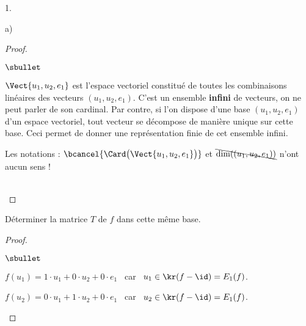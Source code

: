 \documentclass[11pt]{article}%
\begin{document}
\begin{noliste}{1.}
\begin{noliste}{a)}
\begin{proof}
\begin{remarkL}{.98}
\begin{noliste}{$\sbullet$}
        \item $\Vect{u_1, u_2, e_1}$ est l'espace vectoriel constitué
          de toutes les combinaisons linéaires des vecteurs $(u_1,
          u_2, e_1)$. C'est un ensemble {\bf infini} de vecteurs, on
          ne peut parler de son cardinal. Par contre, si l'on dispose
          d'une base $(u_1, u_2, e_1)$ d'un espace vectoriel, tout
          vecteur se décompose de manière unique sur cette base. Ceci
          permet de donner une représentation finie de cet ensemble
          infini.

        \item Les notations : $\bcancel{\Card\big( \Vect{u_1, u_2,
              e_1} \big)}$ et $\bcancel{\dim((u_1, u_2, e_1))}$ n'ont
          aucun sens !
        \end{noliste}
      \end{remarkL}~\\[-1.4cm]
    \end{proof}

  \item Déterminer la matrice $T$ de $f$ dans cette même base.

    \begin{proof}~%
      \begin{noliste}{$\sbullet$}
      \item $f(u_1) = 1 \cdot u_1 + 0 \cdot u_2 + 0 \cdot e_1$ \ car \
        $u_1 \in \kr(f - \id) = E_1(f)$.%

      \item $f(u_2) = 0 \cdot u_1 + 1 \cdot u_2 + 0 \cdot e_1$ \ car \
        $u_2 \in \kr(f - \id) = E_1(f)$.%


\end{noliste}
\end{proof}
\end{noliste}
\end{noliste}
\end{document}
